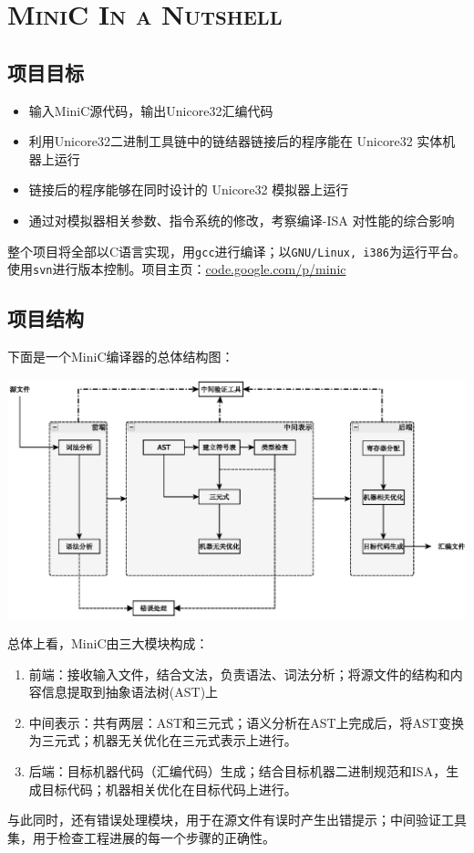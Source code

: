 \section*{\textsc{MiniC In a Nutshell}}
\subsection*{项目目标}
\begin{itemize}
	\item 输入MiniC源代码，输出Unicore32汇编代码
	\item 利用Unicore32二进制工具链中的链结器链接后的程序能在 Unicore32 实体机器上运行
	\item 链接后的程序能够在同时设计的 Unicore32 模拟器上运行
	\item 通过对模拟器相关参数、指令系统的修改，考察编译-ISA 对性能的综合影响
\end{itemize}
整个项目将全部以C语言实现，用\verb|gcc|进行编译；以\verb|GNU/Linux, i386|为运行平台。使用\verb|svn|进行版本控制。项目主页：\href{http://code.google.com/p/minic}{code.google.com/p/minic}
\subsection*{项目结构}
下面是一个MiniC编译器的总体结构图：
\begin{center}
\includegraphics[scale=0.7]{main_structure.eps}
\end{center}
总体上看，MiniC由三大模块构成：
\begin{enumerate}
\item 前端：接收输入文件，结合文法，负责语法、词法分析；将源文件的结构和内容信息提取到抽象语法树(AST)上
\item 中间表示：共有两层：AST和三元式；语义分析在AST上完成后，将AST变换为三元式；机器无关优化在三元式表示上进行。
\item 后端：目标机器代码（汇编代码）生成；结合目标机器二进制规范和ISA，生成目标代码；机器相关优化在目标代码上进行。
\end{enumerate}
与此同时，还有错误处理模块，用于在源文件有误时产生出错提示；中间验证工具集，用于检查工程进展的每一个步骤的正确性。

